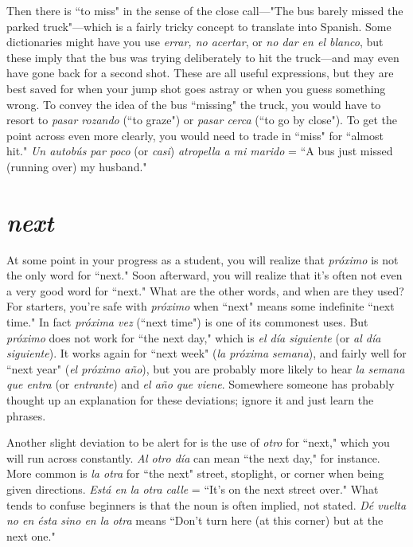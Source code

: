 Then there is ``to miss" in the sense of the close call---"The
bus barely missed the parked truck"---which is a fairly tricky concept
to translate into Spanish. Some dictionaries might have you use \emph{errar,
no acertar}, or \emph{no dar en el blanco}, but these imply that the bus was
trying deliberately to hit the truck---and may even have gone back for
a second shot. These are all useful expressions, but they are best saved
for when your jump shot goes astray or when you guess something
wrong. To convey the idea of the bus ``missing" the truck, you would
have to resort to \emph{pasar rozando} (``to graze") or \emph{pasar cerca} (``to go by
close"). To get the point across even more clearly, you would need to
trade in ``miss" for ``almost hit." \emph{Un autobús par poco} (or \emph{casi}) \emph{atropella a mi marido} = ``A bus just missed (running over) my husband."

\section{\emph{next}}

At some point in your progress as a student, you will realize
that \emph{próximo} is not the only word for ``next." Soon afterward, you will
realize that it's often not even a very good word for ``next." What are
the other words, and when are they used? For starters, you're safe with
\emph{próximo} when ``next" means some indefinite ``next time." In fact
\emph{próxima vez} (``next time") is one of its commonest uses. But \emph{próximo}
does not work for ``the next day," which is \emph{el día siguiente} (or \emph{al día
siguiente}). It works again for ``next week" (\emph{la próxima semana}), and
fairly well for ``next year" (\emph{el próximo año}), but you are probably more
likely to hear \emph{la semana que entra} (or \emph{entrante}) and \emph{el año que viene}.
Somewhere someone has probably thought up an explanation for these
deviations; ignore it and just learn the phrases.

Another slight deviation to be alert for is the use of \emph{otro} for
``next," which you will run across constantly. \emph{Al otro día} can mean
``the next day," for instance. More common is \emph{la otra} for ``the next"
street, stoplight, or corner when being given directions. \emph{Está en la otra
calle} = ``It's on the next street over." What tends to confuse beginners
is that the noun is often implied, not stated. \emph{Dé vuelta no en ésta sino
en la otra} means ``Don't turn here (at this corner) but at the next one."

